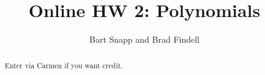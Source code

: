 \documentclass[handout,space,nooutcomes]{xourse}
\title{Online HW 2: Polynomials}
\author{Bart Snapp and Brad Findell}
\begin{document}
\begin{abstract}
Enter via Carmen if you want credit.   
\end{abstract}
\maketitle

{}
\end{document}
